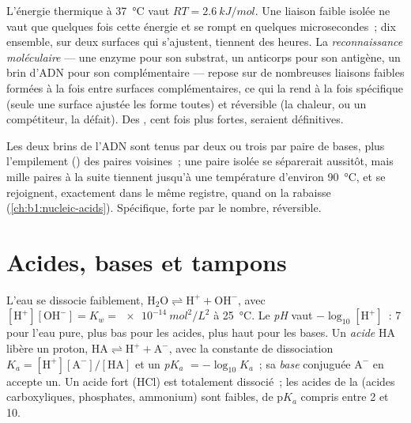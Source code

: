 \begin{proposition}\label{prop:b1:water-small-molecules:weak}
L'énergie thermique à \qty{37}{\celsius} vaut $RT = \qty{2.6}{kJ/mol}$.
Une liaison faible isolée ne vaut que quelques fois cette énergie et se
rompt en quelques microsecondes~; dix ensemble, sur deux surfaces qui
s'ajustent, tiennent des heures. La \emph{reconnaissance
moléculaire} --- une enzyme pour son
substrat, un anticorps pour son antigène, un brin d'ADN pour son
complémentaire --- repose sur de nombreuses liaisons faibles formées à
la fois entre surfaces complémentaires, ce qui la rend à la fois
spécifique (seule une surface ajustée les forme toutes) et réversible
(la chaleur, ou un compétiteur, la défait). Des ,
cent fois plus fortes, seraient définitives.
\end{proposition}

\begin{example}\label{ex:b1:water-small-molecules:melting}
Les deux brins de l'ADN sont tenus par deux ou trois 
par paire de bases, plus l'empilement () des paires
voisines~; une paire isolée se séparerait aussitôt, mais mille paires à
la suite tiennent jusqu'à une température d'environ \qty{90}{\celsius},
et se rejoignent, exactement dans le même registre, quand on la rabaisse
(\cref{ch:b1:nucleic-acids}). Spécifique, forte par le nombre,
réversible.
\end{example}

\section{Acides, bases et tampons}

\begin{definition}\label{def:b1:water-small-molecules:ph}
L'eau se dissocie faiblement, $\mathrm{H_2O} \rightleftharpoons
\mathrm{H^+} + \mathrm{OH^-}$, avec $[\mathrm{H^+}][\mathrm{OH^-}] =
K_w = \qty{e-14}{mol^2/L^2}$ à \qty{25}{\celsius}. Le
\emph{pH} vaut $-\log_{10}[\mathrm{H^+}]$~: 7 pour l'eau pure,
plus bas pour les acides, plus haut pour les bases. Un
\emph{acide} $\mathrm{HA}$ libère un proton,
$\mathrm{HA} \rightleftharpoons \mathrm{H^+} +
\mathrm{A^-}$, avec la constante de dissociation $K_a =
[\mathrm{H^+}][\mathrm{A^-}]/[\mathrm{HA}]$ et un
\emph{p$K_a$} $= -\log_{10}K_a$~; sa
\emph{base} conjuguée $\mathrm{A^-}$ en accepte un. Un acide
fort (HCl) est totalement dissocié~; les acides de la  (acides
carboxyliques, phosphates, ammonium) sont faibles, de p$K_a$ compris
entre 2 et 10.
\end{definition}

